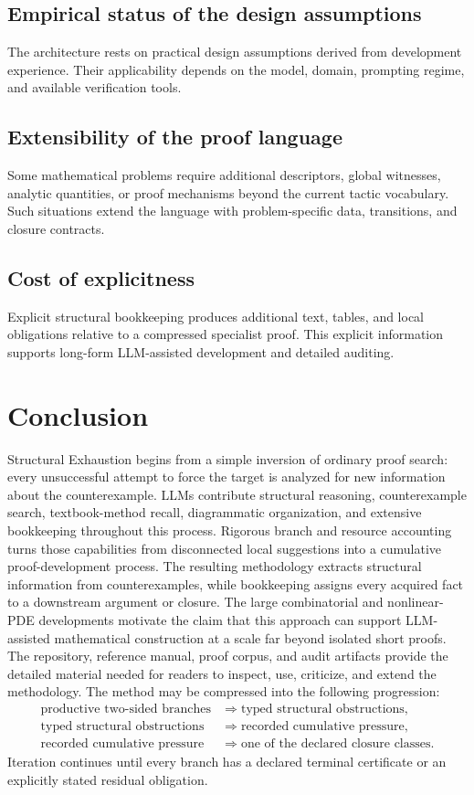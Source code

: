 \documentclass[11pt]{article}
\begin{document}
\subsection{Empirical status of the design assumptions}
The architecture rests on practical design assumptions derived from development experience. Their applicability depends on the model, domain, prompting regime, and available verification tools.
\subsection{Extensibility of the proof language}
Some mathematical problems require additional descriptors, global witnesses, analytic quantities, or proof mechanisms beyond the current tactic vocabulary.
Such situations extend the language with problem-specific data, transitions, and closure contracts.
\subsection{Cost of explicitness}
Explicit structural bookkeeping produces additional text, tables, and local obligations relative to a compressed specialist proof.
This explicit information supports long-form LLM-assisted development and detailed auditing.
\section{Conclusion}
Structural Exhaustion begins from a simple inversion of ordinary proof search: every unsuccessful attempt to force the target is analyzed for new information about the counterexample.
LLMs contribute structural reasoning, counterexample search, textbook-method recall, diagrammatic organization, and extensive bookkeeping throughout this process.
Rigorous branch and resource accounting turns those capabilities from disconnected local suggestions into a cumulative proof-development process.
The resulting methodology extracts structural information from counterexamples, while bookkeeping assigns every acquired fact to a downstream argument or closure.
The large combinatorial and nonlinear-PDE developments motivate the claim that this approach can support LLM-assisted mathematical construction at a scale far beyond isolated short proofs.
The repository, reference manual, proof corpus, and audit artifacts provide the detailed material needed for readers to inspect, use, criticize, and extend the methodology.
The method may be compressed into the following progression:
\[
\begin{aligned}
\text{productive two-sided branches}
  &\Longrightarrow \text{typed structural obstructions},\\
\text{typed structural obstructions}
  &\Longrightarrow \text{recorded cumulative pressure},\\
\text{recorded cumulative pressure}
  &\Longrightarrow \text{one of the declared closure classes}.
\end{aligned}
\]
Iteration continues until every branch has a declared terminal certificate or
an explicitly stated residual obligation.
\end{document}

